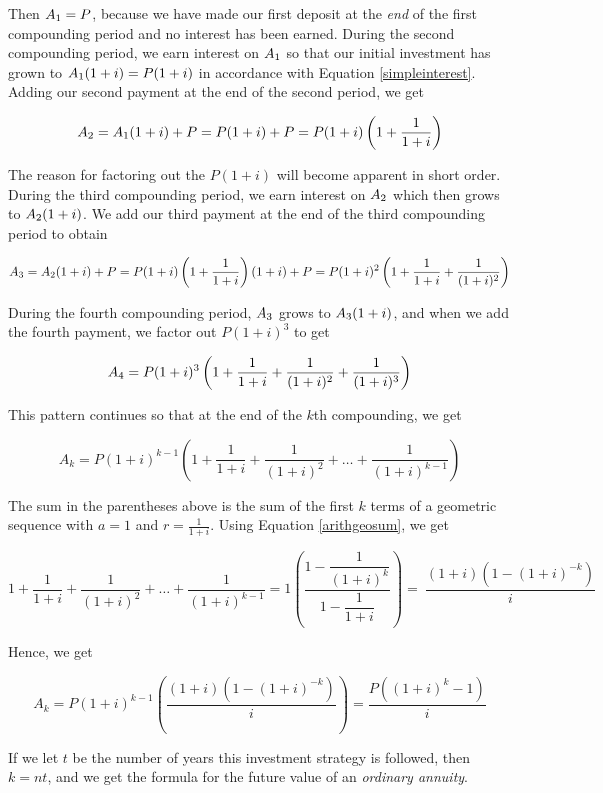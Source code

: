 \documentclass{ximera}
\begin{document}
Then $A_{\mbox{\scriptsize$1$}} = P$, because we have  made our first deposit at the \textit{end} of the first compounding period and no interest has been earned.  During the second compounding period, we earn interest on $A_{\mbox{\scriptsize$1$}}$ so that our initial investment has grown to $A_{\mbox{\scriptsize$1$}}(1+i) = P(1+i)$ in accordance with Equation \ref{simpleinterest}.  Adding our second payment at the end of the second period, we get

\[A_{\mbox{\scriptsize$2$}} = A_{\mbox{\scriptsize$1$}}(1+i) + P = P(1+i) + P = P(1+i)\left(1 + \dfrac{1}{1+i}\right)\]

The reason for factoring out the $P(1+i)$ will become apparent in short order. During the third compounding period, we earn interest on $A_{\mbox{\scriptsize$2$}}$ which then grows to $A_{\mbox{\scriptsize$2$}}(1+i)$.  We add our third payment at the end of the third compounding period to obtain

\[A_{\mbox{\scriptsize$3$}} = A_{\mbox{\scriptsize$2$}}(1+i) + P = P(1+i)\left(1 + \dfrac{1}{1+i}\right)(1+i) + P = P(1+i)^2\left(1 + \dfrac{1}{1+i} + \dfrac{1}{(1+i)^2}\right)\]

During the fourth compounding period, $A_{\mbox{\scriptsize$3$}}$ grows to $A_{\mbox{\scriptsize$3$}}(1+i)$, and when we add the fourth payment, we factor out $P(1+i)^3$ to get

\[A_{\mbox{\scriptsize$4$}} = P(1+i)^3 \left(1 + \dfrac{1}{1+i} + \dfrac{1}{(1+i)^2} + \dfrac{1}{(1+i)^3}\right)\]

This pattern continues so that at the end of the $k$th compounding, we get 

\[A_{k} = P(1+i)^{k-1} \left(1 + \dfrac{1}{1+i} + \dfrac{1}{(1+i)^2} + \ldots + \dfrac{1}{(1+i)^{k-1}}\right) \]

The sum in the parentheses above is the sum of the first $k$ terms of a geometric sequence with $a = 1$ and $r = \frac{1}{1+i}$.  Using Equation \ref{arithgeosum}, we get

\[1 + \dfrac{1}{1+i} + \dfrac{1}{(1+i)^2} + \ldots + \dfrac{1}{(1+i)^{k-1}} = 1 \left(\dfrac{1 - \dfrac{1}{(1+i)^k}}{1 - \dfrac{1}{1+i}}\right) = \
\dfrac{(1+i)\left(1 - (1+i)^{-k}\right)}{i}\]

Hence, we get

\[A_{k} = P(1+i)^{k-1} \left(\dfrac{(1+i)\left(1 - (1+i)^{-k}\right)}{i}\right) = \dfrac{P\left((1+i)^k - 1\right)}{i}\]

If we let $t$ be the number of years this investment strategy is followed, then $k = nt$, and we get the formula for the future value of an  \textit{ordinary annuity}.
\end{document}
